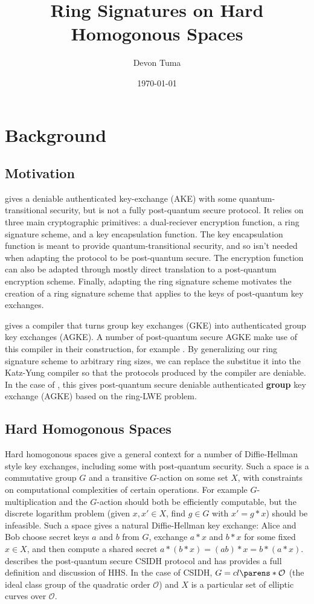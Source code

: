 \documentclass[11pt]{article}
\title{Ring Signatures on Hard Homogonous Spaces}
\author{Devon Tuma}
\date{\today}
\newcommand{\classgroup}{cl\parens*{\mathcal{O}}}
\begin{document}
\maketitle


\section*{Background}

\subsection*{Motivation}

\cite{deniableAKE} gives a deniable authenticated key-exchange (AKE) with some quantum-transitional security, but is not a fully post-quantum secure protocol.
It relies on three main cryptographic primitives: a dual-reciever encryption function, a ring signature scheme, and a key encapsulation function.
The key encapsulation function is meant to provide quantum-transitional security, and so isn't needed when adapting the protocol to be post-quantum secure.
The encryption function can also be adapted through mostly direct translation to a post-quantum encryption scheme.
Finally, adapting the ring signature scheme motivates the creation of a ring signature scheme that applies to the keys of post-quantum key exchanges.

\cite{KYcompiler} gives a compiler that turns group key exchanges (GKE) into authenticated group key exchanges (AGKE).
A number of post-quantum secure AGKE make use of this compiler in their construction, for example \cite{latticeAGKE}.
By generalizing our ring signature scheme to arbitrary ring sizes, we can replace the substitue it into the Katz-Yung compiler so that the protocols produced by the compiler are deniable.
In the case of \cite{latticeAGKE}, this gives post-quantum secure deniable authenticated \textbf{group} key exchange (AGKE) based on the ring-LWE problem.

\subsection*{Hard Homogonous Spaces}

Hard homogonous spaces give a general context for a number of Diffie-Hellman style key exchanges, including some with post-quantum security.
Such a space is a commutative group $G$ and a transitive $G$-action on some set $X$, with constraints on computational complexities of certain operations.
For example $G$-multiplication and the $G$-action should both be efficiently computable, but the discrete logarithm problem (given $x,x' \in X$, find $g \in G$ with $x' = g * x$) should be infeasible.
Such a space gives a natural Diffie-Hellman key exchange: Alice and Bob choose secret keys $a$ and $b$ from $G$, exchange $a * x$ and $b * x$ for some fixed $x \in X$, and then compute a shared secret $a * (b * x) = (ab) * x = b * (a * x)$.
\cite{CSIDH} describes the post-quantum secure CSIDH protocol and has provides a full definition and discussion of HHS.
In the case of CSIDH, $G = \classgroup$ (the ideal class group of the quadratic order $\mathcal{O}$) and $X$ is a particular set of elliptic curves over $\mathcal{O}$.
\end{document}
